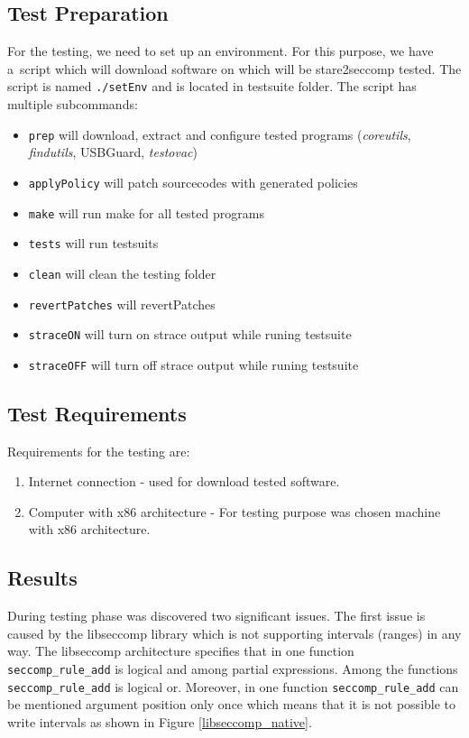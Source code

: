 \subsection{Test Preparation}
For the testing, we need to set up an environment. For this purpose, we have
a~script which will download software on which will be stare2seccomp tested. The
script is named \texttt{./setEnv} and is located in testsuite folder.
The script has multiple subcommands:
\begin{itemize}
	\item \texttt{prep} will download, extract and configure tested programs
		(\emph{coreutils}, \emph{findutils}, USBGuard, \emph{testovac})
	\item \texttt{applyPolicy} will patch sourcecodes with generated policies
	\item \texttt{make} will run make for all tested programs
	\item \texttt{tests} will run testsuits
	\item \texttt{clean} will clean the testing folder
	\item \texttt{revertPatches} will revertPatches
	\item \texttt{straceON} will turn on strace output while runing testsuite
	\item \texttt{straceOFF} will turn off strace output while runing testsuite
\end{itemize}

\subsection{Test Requirements}
Requirements for the testing are:
\begin{enumerate}
	\item Internet connection - used for download tested software.
	\item Computer with x86 architecture - For testing purpose was chosen
	machine with x86 architecture.
\end{enumerate}

\subsection{Results} During testing phase was discovered two significant issues.
The first issue is caused by the libseccomp library which is not supporting
intervals (ranges) in any way. The libseccomp architecture specifies that in one
function \texttt{seccomp\_rule\_add} is logical and among partial expressions.
Among the functions \texttt{seccomp\_rule\_add} is logical or. Moreover, in one
function \texttt{seccomp\_rule\_add} can be mentioned argument position only
once which means that it is not possible to write intervals as shown in Figure
\ref{libseccomp_native}.


